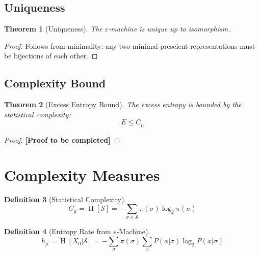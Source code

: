\documentclass[11pt,twocolumn]{article}
\theoremstyle{plain}
\newtheorem{theorem}{Theorem}[section]
\theoremstyle{definition}
\newtheorem{definition}[theorem]{Definition}
\theoremstyle{remark}
\newcommand{\eps}{\varepsilon}
\newcommand{\Cmu}{C_\mu}
\newcommand{\hmu}{h_\mu}
\newcommand{\calS}{\mathcal{S}}
\DeclareMathOperator{\Ent}{H}
\begin{document}
\subsection{Uniqueness}

\begin{theorem}[Uniqueness]
\label{thm:uniqueness}
The $\eps$-machine is unique up to isomorphism.
\end{theorem}
\begin{proof}
Follows from minimality: any two minimal prescient representations must be bijections of each other.
\end{proof}

\subsection{Complexity Bound}

\begin{theorem}[Excess Entropy Bound]
\label{thm:bound}
The excess entropy is bounded by the statistical complexity:
\begin{equation}
    E \leq \Cmu
\end{equation}
\end{theorem}
\begin{proof}
\textbf{[Proof to be completed]}
\end{proof}

\section{Complexity Measures}
\label{sec:measures}

\begin{definition}[Statistical Complexity]
\begin{equation}
    \Cmu = \Ent[\calS] = -\sum_{\sigma \in \calS} \pi(\sigma) \log_2 \pi(\sigma)
\end{equation}
\end{definition}

\begin{definition}[Entropy Rate from $\eps$-Machine]
\begin{equation}
    \hmu = \Ent[X_0 | \calS] = -\sum_{\sigma} \pi(\sigma) \sum_{x} P(x|\sigma) \log_2 P(x|\sigma)
\end{equation}
\end{definition}

\end{document}
